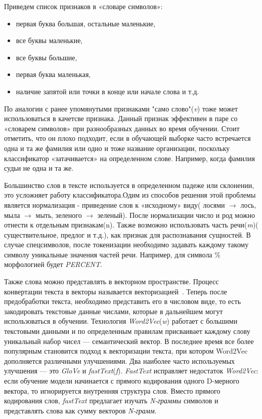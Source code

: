 \documentclass{csmathnotes}
\begin{document}
Приведем список признаков в «словаре символов»:
\begin{itemize}
    \item первая буква большая, остальные маленькие,
    \item все буквы маленькие,
    \item все буквы большие,
    \item первая буква маленькая,
    \item наличие запятой или точки в конце или начале слова и т.д.
\end{itemize}


По аналогии с ранее упомянутыми признаками "само слово"(\emph{v}) тоже может использоваться в качетсве признака. Данный признак эффективен в паре со «словарем символов» при разнообразных данных во время обучении. Стоит отметить, что он плохо подходит, если в обучающей выборке часто встречается одна и та же фамилия или одно и тоже название организации, поскольку классификатор «затачивается» на определенном слове. Например, когда фамилия судьи не одна и та же.


Большинство слов в тексте используется в определенном падеже или склонении, это усложняет работу классификатора.Одим из способов решения этой проблемы является нормализация - приведение слов к «исходному» виду( лосями $\rightarrow$  лось, мыла $\rightarrow$ мыть, зеленого $\rightarrow$ зеленый). После нормализации число и род  можно отнести к отдельным признакам(n). Также возможно использовать часть речи(\emph{m})( существительное, предлог и т.д.), как признак для распознавания сущностей. В случае спецсимволов, после токенизации необходимо задавать каждому такому символу уникальные значения частей речи. Например, для символа \% морфологией будет \emph{PERCENT}.

 
Также слова можно представлять в векторном пространстве. Процесс конвертации текста в векторы называется векторизацией~\cite{w2v}. Теперь после предобработки текста, необходимо представить его в числовом виде, то есть закодировать текстовые данные числами, которые в дальнейшем могут использоваться в обучении. Технология \emph{Word2Vec}(\emph{w}) работает с большими текстовыми данными и по определенным правилам присваивает каждому слову уникальный набор чисел — семантический вектор. В последнее время все более популярным становится подход к векторизации текста, при котором Word2Vec дополняется различными улучшениями. Два наиболее часто используемых улучшения — это \emph{GloVe} и \emph{fastText}(\emph{f}). \emph{FastText} исправляет недостаток \emph{Word2Vec}: если обучение модели начинается с прямого кодирования одного D-мерного вектора, то игнорируется внутренняя структура слов. Вместо прямого кодирования слов, \emph{fastText} предлагает изучать \emph{N-граммы} символов и представлять слова как сумму векторов \emph{N-грамм}.
\end{document}

